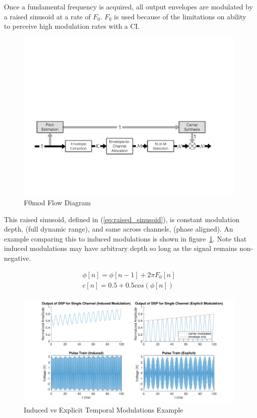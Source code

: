 \documentclass [11pt, proquest,oneside] {ganter_thesis}[2015/03/03]
\begin{document}
Once a fundamental frequency is acquired, all output envelopes are modulated by a raised sinusoid at a rate of $F_0$.  $F_0$ is used because of the limitations on ability to perceive high modulation rates with a CI.

\begin{figure}[!ht]
  \centering
    \includegraphics[width=1\textwidth]{F0mod_flow_diagram}   
    \caption{F0mod Flow Diagram}
\end{figure}

This raised sinusoid, defined in (\ref{eq:raised_sinusoid}), is constant modulation depth, (full dynamic range), and same across channels, (phase aligned).  An example comparing this to induced modulations is shown in figure~\ref{fig:induced_vs_explicit}.  Note that induced modulations may have arbitrary depth so long as the signal remains non-negative.

\begin{align}
\label{eq:raised_sinusoid}
\phi[n] = \phi[n - 1] + 2\pi F_0[n] \\
c[n] = 0.5 + 0.5cos(\phi[n])
\end{align}

\begin{figure}[!ht]
  \centering
    \includegraphics[width=1\textwidth]{matlab/induced_vs_explicit}   
    \caption{Induced vs Explicit Temporal Modulations Example}\label{fig:induced_vs_explicit}
\end{figure}
\end{document}
